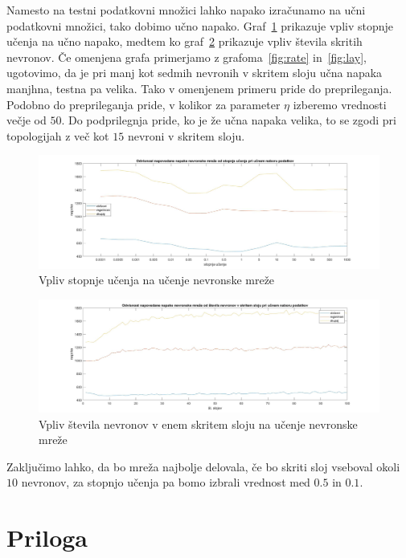 \documentclass[mat1]{fmfdelo}
\begin{document}
Namesto na testni podatkovni množici lahko napako izračunamo na učni podatkovni množici, tako dobimo učno napako. Graf~\ref{fig:rate_l} prikazuje vpliv stopnje učenja na učno napako, medtem ko graf~\ref{fig:lay_l} prikazuje vpliv števila skritih nevronov. Če omenjena grafa primerjamo z grafoma~\ref{fig:rate} in~\ref{fig:lay}, ugotovimo, da je pri manj kot sedmih nevronih v skritem sloju učna napaka manjhna, testna pa velika. Tako v omenjenem primeru pride do preprileganja. Podobno do preprileganja pride, v kolikor za parameter $\eta$ izberemo vrednosti večje od $50$. Do podprilegnja pride, ko je že učna napaka velika, to se zgodi pri topologijah z več kot $15$ nevroni v skritem sloju.
%
\begin{figure}[!h]
	\centering
	\includegraphics[width=1\textwidth]{rate_learn.jpg}
	\caption{Vpliv stopnje učenja na učenje nevronske mreže}
	\label{fig:rate_l}
\end{figure}
%
\begin{figure}[!ht]
	\centering
	\includegraphics[width=1\textwidth]{lay_learned.jpg}
	\caption{Vpliv števila nevronov v enem skritem sloju na učenje nevronske mreže}
	\label{fig:lay_l}
\end{figure}
%
Zaključimo lahko, da bo mreža najbolje delovala, če bo skriti sloj vseboval okoli $10$ nevronov, za stopnjo učenja pa bomo izbrali vrednost med $0.5$ in $0.1$.
%
\section{Priloga} \label{priloga}
\inputminted{ocaml}{nevronske_mreze.ml}
\end{document}
